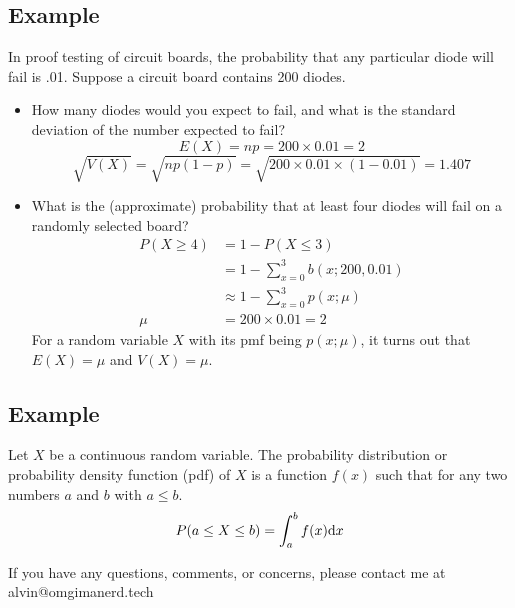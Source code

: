\documentclass[letterpaper, 12pt]{math}
\begin{document}
\subsection*{Example}
In proof testing of circuit boards, the probability that any particular diode
will fail is .01. Suppose a circuit board contains 200 diodes.
\begin{itemize}
  \item How many diodes would you expect to fail, and what is the standard
    deviation of the number expected to fail?
    \[ E(X) = np = 200\times0.01 = 2 \]
    \[ \sqrt{V(X)} = \sqrt{np(1-p)} = \sqrt{200\times0.01\times(1-0.01)} =
       1.407 \]
  \item What is the (approximate) probability that at least four diodes will
    fail on a randomly selected board?
    \begin{align*}
      P(X\geq 4) &= 1-P(X\leq 3) \\
      &= 1-\sum_{x=0}^{3}b(x;200,0.01) \\
      &\approx 1-\sum_{x=0}^{3}p(x;\mu) \\
      \mu &= 200\times0.01 = 2
    \end{align*}
    For a random variable \( X \) with its pmf being \( p(x;\mu) \), it turns
    out that \( E(X) = \mu \) and \( V(X) = \mu \).
\end{itemize}

\subsection*{Example}
Let \( X \) be a continuous random variable. The probability distribution or
probability density function (pdf) of \( X \) is a function \( f(x) \) such that
for any two numbers \( a \) and \( b \) with \( a \leq b \).
\[ P(a\leq X\leq b) = \int_{a}^{b}f(x)\mathrm{d}{x} \]

\begin{center}
  If you have any questions, comments, or concerns, please contact me at
  alvin@omgimanerd.tech
\end{center}
\end{document}

